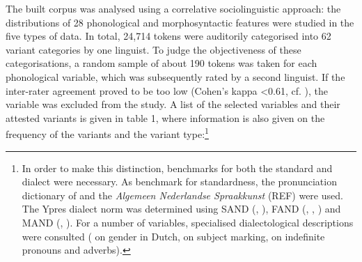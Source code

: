 \documentclass[output=paper]{LSP/langsci}
\begin{document}
The built corpus was analysed using a correlative sociolinguistic approach: the distributions of 28 phonological and morphosyntactic features were studied in the five types of data. In total, 24,714 tokens were auditorily categorised into 62 variant categories by one linguist. To judge the objectiveness of these categorisations, a random sample of about 190 tokens was taken for each phonological variable, which was subsequently rated by a second linguist. If the inter-rater agreement proved to be too low (Cohen's kappa {\textless}0.61, cf. \citealt[165]{landis_measurement_1977}), the variable was excluded from the study. A list of the selected variables and their attested variants is given in table 1, where information is also given on the frequency of the variants and the variant type:\footnote{In order to make this distinction, benchmarks for both the standard and dialect were necessary. As benchmark for standardness, the pronunciation dictionary of \citet{heemskerk_uitspraakwoordenboek_2000} and the \textit{Algemeen Nederlandse Spraakkunst} (REF)
were used. The Ypres dialect norm was determined using SAND (\citealt{barbiers_syntactische_2005}, \citealt{barbiers_syntactische_2008}), 
FAND (\citealt{de_wulf_fonologische_2005}, \citealt{goossens_fonologische_2000}, \citealt{goossens_fonologische_1998}) and 
MAND (\citealt{de_schutter_morfologische_2005}, \citealt{goeman_mand_2008}). For a number of variables, specialised dialectological descriptions were consulted (\citealt{cornips_variatie_2009} on gender in Dutch, \citealt{de_vogelaer_nederlandse_2008} on subject marking, \citealt{de_vogelaer_iemand_2006} on indefinite pronouns and adverbs).}
\end{document}
